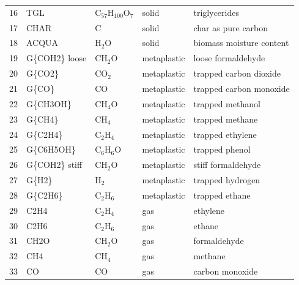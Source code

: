 \begin{center}
\begin{longtable}{cllll}
    16 & TGL            & C$_{57}$H$_{100}$O$_7$  & \cellcolor{green!25}solid        & triglycerides \\
    17 & CHAR           & C                       & \cellcolor{green!25}solid        & char as pure carbon \\
    18 & ACQUA          & H$_2$O                  & \cellcolor{green!25}solid        & biomass moisture content \\
    19 & G\{COH2\} loose& CH$_2$O                 & \cellcolor{orange!25}metaplastic & loose formaldehyde \\
    20 & G\{CO2\}       & CO$_2$                  & \cellcolor{orange!25}metaplastic & trapped carbon dioxide \\
    21 & G\{CO\}        & CO                      & \cellcolor{orange!25}metaplastic & trapped carbon monoxide \\
    22 & G\{CH3OH\}     & CH$_4$O                 & \cellcolor{orange!25}metaplastic & trapped methanol \\
    23 & G\{CH4\}       & CH$_4$                  & \cellcolor{orange!25}metaplastic & trapped methane \\
    24 & G\{C2H4\}      & C$_2$H$_4$              & \cellcolor{orange!25}metaplastic & trapped ethylene \\
    25 & G\{C6H5OH\}    & C$_6$H$_6$O             & \cellcolor{orange!25}metaplastic & trapped phenol \\
    26 & G\{COH2\} stiff& CH$_2$O                 & \cellcolor{orange!25}metaplastic & stiff formaldehyde \\
    27 & G\{H2\}        & H$_2$                   & \cellcolor{orange!25}metaplastic & trapped hydrogen \\
    28 & G\{C2H6\}      & C$_2$H$_6$              & \cellcolor{orange!25}metaplastic & trapped ethane \\
    29 & C2H4           & C$_2$H$_4$              & \cellcolor{purple!25}gas         & ethylene \\
    30 & C2H6           & C$_2$H$_6$              & \cellcolor{purple!25}gas         & ethane \\
    31 & CH2O           & CH$_2$O                 & \cellcolor{purple!25}gas         & formaldehyde \\
    32 & CH4            & CH$_4$                  & \cellcolor{purple!25}gas         & methane \\
    33 & CO             & CO                      & \cellcolor{purple!25}gas         & carbon monoxide \\

\end{longtable}
\end{center}
